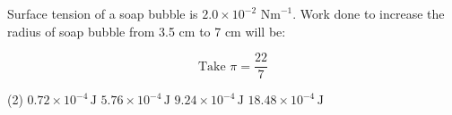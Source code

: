 \item Surface tension of a soap bubble is \(2.0 \times 10^{-2} \text{ Nm}^{-1}\). Work done to increase the radius of soap bubble from 3.5 cm to 7 cm will be:
    \begin{center}
        \[ \text{Take } \pi = \frac{22}{7} \]
    \end{center}
    \begin{tasks}(2)
        \task \(0.72 \times 10^{-4} \, \text{J}\)
        \task \(5.76 \times 10^{-4} \, \text{J}\)
        \task \(9.24 \times 10^{-4} \, \text{J}\)
        \task \(18.48 \times 10^{-4} \, \text{J}\)
    \end{tasks}